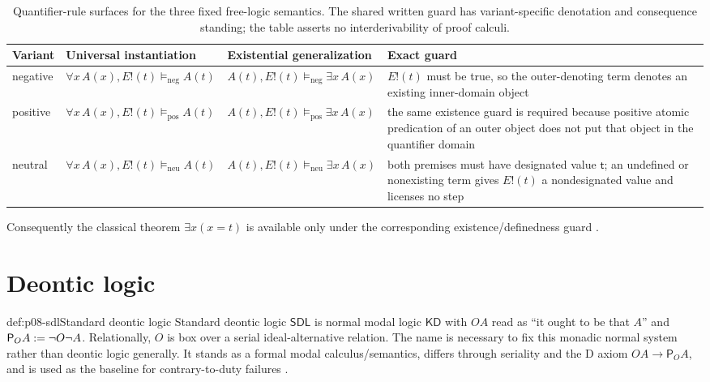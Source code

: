 \begin{table}[htbp]
\centering\small
\begin{tabularx}{\textwidth}{@{}l X X X@{}}
\toprule
Variant & Universal instantiation & Existential generalization & Exact guard \\
\midrule
negative &
\(\forall x\,A(x),E!(t)\models_{\mathrm{neg}}A(t)\) &
\(A(t),E!(t)\models_{\mathrm{neg}}\exists x\,A(x)\) &
\(E!(t)\) must be true, so the outer-denoting term denotes an existing
inner-domain object \\
positive &
\(\forall x\,A(x),E!(t)\models_{\mathrm{pos}}A(t)\) &
\(A(t),E!(t)\models_{\mathrm{pos}}\exists x\,A(x)\) &
the same existence guard is required because positive atomic predication of an
outer object does not put that object in the quantifier domain \\
neutral &
\(\forall x\,A(x),E!(t)\models_{\mathrm{neu}}A(t)\) &
\(A(t),E!(t)\models_{\mathrm{neu}}\exists x\,A(x)\) &
both premises must have designated value \(\mathsf t\); an undefined or
nonexisting term gives \(E!(t)\) a nondesignated value and licenses no step \\
\bottomrule
\end{tabularx}
\caption{Quantifier-rule surfaces for the three fixed free-logic semantics.
The shared written guard has variant-specific denotation and consequence
standing; the table asserts no interderivability of proof calculi.}
\label{tab:p08-free-logic-quantifier-rules}
\end{table}

Consequently the classical theorem \(\exists x(x=t)\) is available only under
the corresponding existence/definedness guard
\cite{GratzlPavlovicNolt2025}.

\section{Deontic logic}

\begin{hbdefinition}{def:p08-sdl}{Standard deontic logic}
Standard deontic logic \(\mathsf{SDL}\) is normal modal logic \(\mathsf{KD}\)
with \(O A\) read as ``it ought to be that \(A\)'' and
\(\mathsf P_O A\mathrel{:=}\neg O\neg A\). Relationally, \(O\) is box over a serial
ideal-alternative relation. The name is necessary to fix this monadic normal
system rather than deontic logic generally. It stands as a formal modal
calculus/semantics, differs through seriality and the D axiom
\(OA\to\mathsf P_OA\), and is used as the baseline for contrary-to-duty failures
\cite{VonWright1951,McNamara2006}.
\end{hbdefinition}

